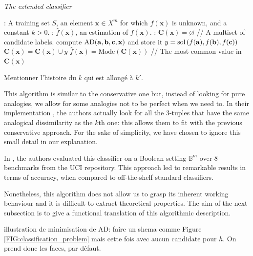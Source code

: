 \begin{algorithm}[!ht]
 \caption{\textit{The extended classifier}}
       \label{ALGO:extended_classifier}
       \begin{algorithmic}

      : A training set $S$, an element $\mathbf{x} \in X^m$
         for which $f(\mathbf{x})$ is unknown, and a constant $k > 0$.
         : $\hat{f}(\mathbf{x})$, an estimation of
         $f(\mathbf{x})$.
    : $\mathbf{C}(\mathbf{x}) = \varnothing$ \quad \quad // A
    multiset of candidate labels.
         \STATE compute $\text{AD}(\mathbf{a}, \mathbf{b}, \mathbf{c}, \mathbf{x})$ and store it
	    \ENDFOR
        \STATE $y = \text{sol}\left(f(\mathbf{a}), f(\mathbf{b}), f(\mathbf{c})\right)$
    \STATE $ \mathbf{C}(\mathbf{x}) = \mathbf{C}(\mathbf{x}) \cup y$
    \ENDFOR
    \STATE $\hat{f}(\mathbf{x}) = \text{Mode} (\mathbf{C}(\mathbf{x}))$ // The
         most common value in $\mathbf{C}(\mathbf{x})$
\end{algorithmic}
\end{algorithm}

Mentionner l'histoire du $k$ qui est allongé à $k'$.


This algorithm is similar to the conservative one but, instead of looking for
pure analogies, we allow for some analogies not to be perfect when we need to.
In their implementation \cite{BayMicDelIJCAI07}, the authors actually look for
all the 3-tuples that have the same analogical dissimilarity as the $k$th one:
this allows them to fit with the previous conservative approach. For the sake of
simplicity, we have chosen to
ignore this small detail in our explanation.

In \cite{BayMicDelIJCAI07}, the authors evaluated this classifier on a Boolean setting
$\mathbb{B}^m$ over 8 benchmarks from the UCI repository.  This approach led to
remarkable results in terms of accuracy, when compared to off-the-shelf
standard classifiers.

Nonetheless, this algorithm does not allow us to grasp its inherent working
behaviour and it is difficult to extract theoretical properties. The aim of the
next subsection is to give a functional translation of this algorithmic
description.

illustration de minimisation de AD: faire un shema comme Figure
\ref{FIG:classification_problem} mais cette fois avec aucun candidate pour $h$.
On prend donc les faces, par défaut.

